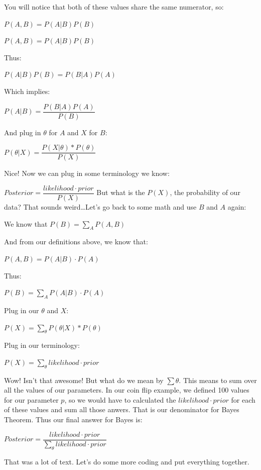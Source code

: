 You will notice that both of these values share the same numerator, so:

$P(A,B) = P(A|B) P(B)$

$P(A,B) = P(A|B) P(B)$

Thus:

$P(A|B) P(B) = P(B|A) P(A)$

Which implies:

$P(A|B) = \dfrac{P(B|A) P(A)}{P(B)}$

And plug in $\theta$ for $A$ and $X$ for $B$:

$P(\theta|X) = \dfrac{P(X|\theta)*P(\theta)}{P(X)}$

Nice! Now we can plug in some terminology we know:

$Posterior = \dfrac{likelihood \cdot prior}{P(X)}$
But what is the $P(X)$, the probability of our data? 
That sounds weird\ldots Let’s go back to some math and use $B$ and $A$ again:

We know that $P(B)=\sum_A P(A,B)$

And from our definitions above, we know that:

$P(A,B) = P(A|B)\cdot P(A)$

Thus:

$P(B) = \sum_{A} P(A|B)\cdot P(A)$

Plug in our $\theta$ and $X$:

$P(X) = \sum_{\theta} P(\theta|X)*P(\theta)$

Plug in our terminology:

$P(X) = \sum_{\theta} likelihood \cdot prior$

Wow! Isn’t that awesome! But what do we mean by $\sum\theta$. This means to sum over all the values of our parameters. In our coin flip example, we defined 100 values for our parameter $p$, so we would have to calculated the $likelihood \cdot  prior$ for each of these values and sum all those anwers. That is our denominator for Bayes Theorem. Thus our final answer for Bayes is:

$Posterior = \dfrac{likelihood \cdot prior}{\sum_{\theta} likelihood \cdot prior}$

That was a lot of text. Let’s do some more coding and put everything together.

